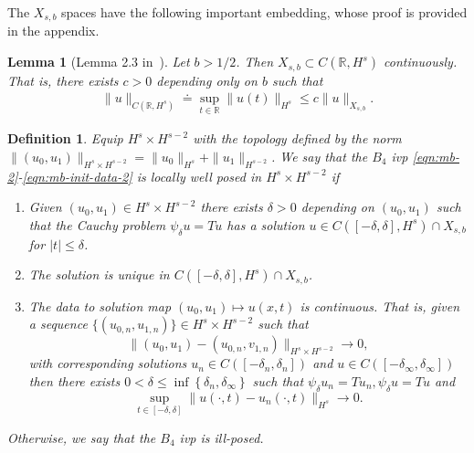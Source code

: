 \documentclass[12pt,reqno]{amsart}
\numberwithin{equation}{section}  %
\newcommand{\rr}{\mathbb{R}}
\newtheorem{lemma}[theorem]{Lemma}
\newtheorem{definition}[theorem]{Definition}
\begin{document}
%
The $X_{s,b}$ spaces have the following important embedding, whose proof is
provided in the appendix.
%
%
%
%
%
%
%
%
\begin{lemma}[Lemma 2.3 in~\cite{Farah:2009uq}]
  Let $b > 1/2$. Then $X_{s, b} \subset C(\rr, H^s)$ continuously. That is,
  there exists $c>0$ depending only on $b$ such that
%
%
\begin{equation*}
\begin{split}
  \| u \|_{C(\rr, H^s)} \doteq \sup_{t \in \rr} \| u(t) \|_{H^s} 
  \le c \| u \|_{X_{s,b}}.
\end{split}
\end{equation*}
%
\label{lem:embedding}
\end{lemma}
%
\begin{definition}
  Equip $H^{s} \times H^{s-2}$ with the 
  topology defined by the norm $\|(u_{0}, u_{1})\|_{H^{s} \times H^{s-2}}
  = \|u_{0}\|_{H^{s}} + \|u_{1}\|_{H^{s-2}}$.
   We say that the $B_{4}$ ivp
  \eqref{eqn:mb-2}-\eqref{eqn:mb-init-data-2} is
	\emph{locally well posed} in
  $H^s \times H^{s-2}$ if 
	\begin{enumerate}
    \item Given $(u_{0}, u_{1}) \in H^{s} \times H^{s-2}$
      there exists $\delta>0$ depending on $(u_{0}, u_{1})$
      such that the Cauchy problem
      $\psi_{\delta} u = Tu$ has a solution $u \in C([-\delta,
      \delta], H^s) \cap X_{s,b}$ for $ |t| \le \delta$.
    \item The solution is unique in $C([-\delta, \delta], H^{s}) \cap
      X_{s,b}$.
    \item
      The data to solution map $(u_0, u_{1}) \mapsto u(x,t)$ is continuous. That
      is, given a sequence $\{(u_{0,n}, u_{1,n} ) \} \in H^{s} \times H^{s-2}$
      such that $$\|(u_{0}, u_{1})
      - (u_{0,n}, v_{1,n}) \|_{H^{s} \times
      H^{s-2}} \to 0,$$ with corresponding solutions $u_{n} \in
      C([-\delta_{n},
      \delta_{n}])$ and $u \in C([-\delta_{\infty}, \delta_{\infty}])$
      then there exists $0 < \delta \le \inf\left\{
      \delta_{n}, \delta_{\infty} \right\}$ such that $\psi_{\delta}u_{n} =
      Tu_{n}, \psi_{\delta}u = Tu$ and 
      $$\sup_{t \in [-\delta, \delta]}
      \|u(\cdot, t) - u_{n}(\cdot, t) \|_{H^s} \to 0.$$
  \end{enumerate}
	Otherwise, we say that the $B_{4}$ ivp is \emph{ill-posed}.
\end{definition}
%
\end{document}
